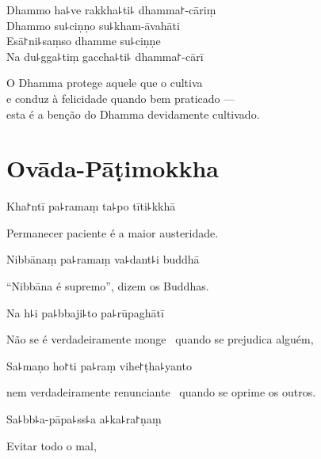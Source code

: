 Dhammo ha꜕ve rakkha꜕ti꜕ dhamma꜓-cāriṃ\\
Dhammo su꜕ciṇṇo su꜕kham-āvahāti\\
Esā꜓ni꜕saṃso dhamme su꜕ciṇṇe\\
Na du꜕gga꜕tiṃ gaccha꜕ti꜕ dhamma꜓-cārī

\begin{english}
  O Dhamma protege aquele que o cultiva\\
  e conduz à felicidade quando bem praticado ---\\
  esta é a benção do Dhamma devidamente cultivado.
\end{english}

\chapter{Ovāda-Pāṭimokkha}


\enlargethispage{\baselineskip}

\begin{leader}
\end{leader}

Kha꜓ntī pa꜕ramaṃ ta꜕po tīti꜕kkhā

\begin{english}
  Permanecer paciente é a maior austeridade.
\end{english}

Nibbānaṃ pa꜕ramaṃ va꜕dant꜕i buddhā

\begin{english}
  “Nibbāna é supremo”, dizem os Buddhas.
\end{english}

Na h꜕i pa꜕bbaji꜕to pa꜕rūpaghātī

\begin{english}
  Não se é verdadeiramente monge \pause\ quando se prejudica alguém,
\end{english}

Sa꜕maṇo ho꜓ti pa꜕raṃ vihe꜓ṭha꜕yanto

\begin{english}
  nem verdadeiramente renunciante \pause\ quando se oprime os outros.
\end{english}

Sa꜕bb꜕a-pāpa꜕ss꜕a a꜕ka꜕ra꜓ṇaṃ

\begin{english}
  Evitar todo o mal,
\end{english}

